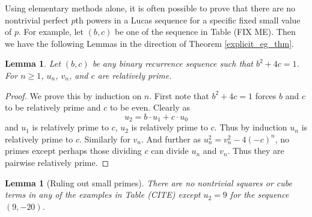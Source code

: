 \documentclass[12pt]{amsart}
\newtheorem{lem}[thm]{Lemma}
\theoremstyle{definition}
\begin{document}
Using elementary methods alone, it is often possible to prove that there are no nontrivial perfect $p$th powers in a Lucas sequence for a specific fixed small value of $p$.  For example, let $(b,c)$ be one of the sequence in Table (FIX ME).  Then we have the following Lemmas in the direction of Theorem \ref{explicit_eg_thm}.

\begin{lem}\label{relprime}
Let $(b,c)$ be any binary recurrence sequence such that $b^2+4c=1$.  For $n \geq 1$,  $u_n$, $v_n$, and $c$ are relatively prime.
\end{lem}

\begin{proof}
We prove this by induction on $n$.  First note that $b^2 +4c = 1$ forces $b$ and $c$ to be relatively prime and $c$ to be even.  Clearly as
\[ u_2 = b \cdot u_1 + c \cdot u_0 \]
and $u_1$ is relatively prime to $c$, $u_2$ is relatively prime to $c$.  Thus by induction $u_n$ is relatively prime to $c$.  Similarly for $v_n$.  And further as $u_n^2  = v_n^2 - 4(-c)^n$, no primes except perhaps those dividing $c$ can divide $u_n$ and $v_n$.  Thus they are pairwise relatively prime.
\end{proof}

\begin{lem}[Ruling out small primes]\label{smallp}
There are no nontrivial squares or cube terms in any of the examples in Table (CITE) except $u_2 = 9$ for the sequence $(9,-20)$.
\end{lem}
\end{document}
